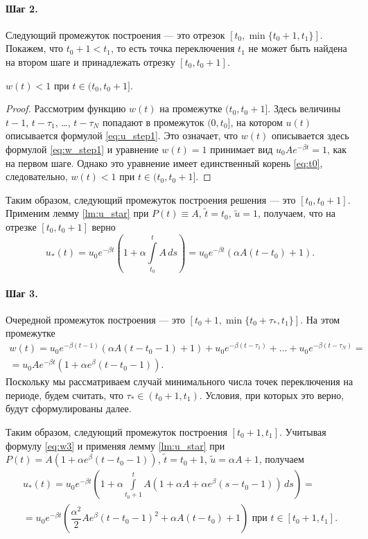 \paragraph{Шаг 2.} Следующий промежуток построения --- это отрезок  $[t_0, \min\{t_0 + 1, t_1\}]$.
Покажем, что $t_0+1 < t_1$, то есть точка переключения $t_1$ не может быть найдена на втором шаге и принадлежать отрезку $[t_0, t_0 + 1]$.
\begin{lemma}
	\label{lm:u_step2}
	$w(t)<1$ при $t \in (t_0, t_0 + 1]$.
\end{lemma}
\begin{proof}
	Рассмотрим функцию $w(t)$ на промежутке $(t_0,t_0+1]$. Здесь величины $t - 1$, $t - \tau_1$, \dots, $t - \tau_N$ попадают в промежуток $(0, t_0]$, на котором $u(t)$ описывается формулой \eqref{eq:u_step1}. Это означает, что $w(t)$ описывается здесь формулой \eqref{eq:w_step1} и уравнение $w(t) = 1$ принимает вид $u_0 A e^{-\beta t} = 1$, как на первом шаге. Однако это  уравнение имеет единственный корень \eqref{eq:t0}, следовательно, $w(t) < 1$ при $t \in (t_0, t_0 + 1]$.
\end{proof}

Таким образом, следующий промежуток построения решения --- это $[t_0,t_0+1]$. Применим лемму \ref{lm:u_star} при $P(t)\equiv A$, $\tilde{t} = t_0$, $\tilde{u} = 1$, получаем, что на отрезке $[t_0, t_0 + 1]$ верно
\begin{equation}
	\label{eq:u_step2}
	u_*(t)= u_0 e^{-\beta t}\left(1 + \alpha\int\limits_{t_0}^t A\,ds \right) = u_0 e^{-\beta t}(\alpha A(t-t_0) + 1).
\end{equation}

\paragraph{Шаг 3.} Очередной промежуток построения --- это $[t_0 + 1, \min\{t_0 + \tau_*, t_1\}]$. На этом промежутке
%
\begin{multline}
	\label{eq:w3}
	w(t)=u_0 e^{-\beta (t-1)}(\alpha A(t-t_0-1)+1)+u_0 e^{-\beta(t - \tau_1)} + \ldots + u_0 e^{-\beta(t-\tau_N)} = \\
	= u_0 A e^{-\beta t}(1 + \alpha e^{\beta}(t - t_0 - 1)).
\end{multline}
Поскольку мы рассматриваем случай минимального числа точек переключения на периоде, будем считать, что $\tau_* \in (t_0 + 1, t_1)$. Условия, при которых это верно, будут сформулированы далее.

Таким образом, следующий промежуток построения $[t_0 + 1, t_1]$. Учитывая формулу \eqref{eq:w3} и применяя лемму \ref{lm:u_star} при $P(t) = A(1 + \alpha e^\beta(t - t_0 - 1))$, $\tilde{t} = t_0+1$, $\tilde{u}=\alpha A+1$, получаем
\begin{multline}
	\label{eq:u_step3}
	u_*(t) = u_0 e^{-\beta t}\left(1 + \alpha\int\limits_{t_0 + 1}^t A(1 + \alpha A + \alpha e^\beta(s - t_0 - 1)) \,ds \right) =\\= u_0 e^{-\beta t}\left(\dfrac{\alpha^2}{2}Ae^{\beta}(t-t_0-1)^2+\alpha A(t-t_0)+1\right)\text{ при }t\in[t_0+1,t_1].
\end{multline}

